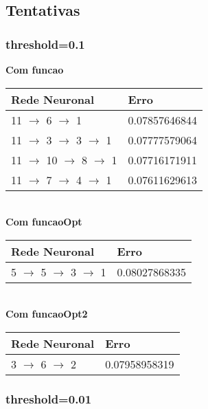 \documentclass{article}
\begin{document}
\subsection{Tentativas}

\subsubsection{threshold=0.1}

\textbf{Com funcao}\\
\begin{tabular}{ | l | l | }
\hline
Rede Neuronal & Erro\\ \hline
11 $\to$ 6 $\to$ 1 & 0.07857646844\\ \hline
11 $\to$ 3 $\to$ 3 $\to$ 1 & 0.07777579064\\ \hline
11 $\to$ 10 $\to$ 8 $\to$ 1 & 0.07716171911\\ \hline
11 $\to$ 7 $\to$ 4 $\to$ 1 & 0.07611629613\\ \hline
\end{tabular}
\\
\textbf{Com funcaoOpt}\\
\begin{tabular}{ | l | l | }
\hline
Rede Neuronal & Erro\\ \hline
5 $\to$ 5 $\to$ 3 $\to$ 1 & 0.08027868335\\ \hline
\end{tabular}
\\
\textbf{Com funcaoOpt2}\\
\begin{tabular}{ | l | l | }
\hline
Rede Neuronal & Erro\\ \hline
3 $\to$ 6 $\to$ 2 & 0.07958958319\\ \hline
\end{tabular}

\subsubsection{threshold=0.01}
\end{document}
